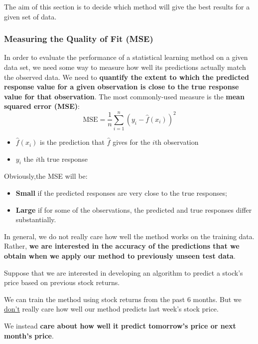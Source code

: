 \documentclass[a4paper]{article}
\newcommand{\definition}[1]{\textcolor{Red3}{\textbf{#1}}\index{#1}}
\newcommand{\highspace}{\vspace{1.2em}\noindent}
\begin{document}
    The aim of this section is to decide which method will give the best results for a given set of data.

    \subsubsection{Measuring the Quality of Fit (MSE)}

    In order to evaluate the performance of a statistical learning method on a given data set, we need some way to measure how well its predictions actually match the observed data. We need to \textbf{quantify the extent to which the predicted response value for a given observation is close to the true response value for that observation}. The most commonly-used measure is the \definition{mean squared error (MSE)}:
    \begin{equation}\label{eq: mean squared error}
        \mathrm{MSE} = \dfrac{1}{n} \displaystyle\sum_{i=1}^{n} \left(y_{i} - \hat{f}\left(x_{i}\right)\right)^{2}
    \end{equation}
    \begin{itemize}
        \item $\hat{f}\left(x_{i}\right)$ is the prediction that $\hat{f}$ gives for the $i$th observation
        \item $y_{i}$ the $i$th true response
    \end{itemize}
    Obviously,the MSE will be:
    \begin{itemize}
        \item \textbf{Small} if the predicted responses are very close to the true responses;
        \item \textbf{Large} if for some of the observations, the predicted and true responses differ substantially.
    \end{itemize}
    In general, we do not really care how well the method works on the training data. Rather, \textbf{we are interested in the accuracy of the predictions that we obtain when we apply our method to previously unseen test data}.

    \begin{examplebox}
        Suppose that we are interested in developing an algorithm to predict a stock's price based on previous stock returns.

        \highspace
        We can train the method using stock returns from the past 6 months. But we \underline{don't} really care how well our method predicts last week's stock price.

        We instead \textbf{care about how well it predict tomorrow's price or next month's price}.
    \end{examplebox}
\end{document}
